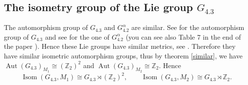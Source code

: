 \documentclass[12pt,a4paper,twoside]{article}
\theoremstyle{definition}
\begin{document}
\subsection{The isometry group of the Lie group $G_{4.3}$}
The automorphism group of $G_{4.3}$ and $G_{4.2}^{\alpha}$ are similar. See \cite{christodoulakis2003automorphisms} for the automorphism group of $G_{4.3}$ and see \cite{christodoulakis2003corrigendum} for the one of $G_{4.2}^{\alpha}$ (you can see also Table 7 in the end of the paper \cite{biggs2016classification}). Hence these Lie groups have similar metrics, see \cite{aitbenhaddou2025classification}. Therefore they have similar isometric automorphism groups, thus by theorem \ref{similar}, we have $\operatorname{Aut}\left(G_{4.3}\right)_{M_1}  \cong \left(\mathbb{Z}_2\right)^2$ and $\operatorname{Aut}\left(G_{4.3}\right)_{M_2}  \cong \mathbb{Z}_2$. Hence
$$\operatorname{Isom}\left(G_{4.3}, M_{1}\right)  \cong G_{4.3} \rtimes \left(\mathbb{Z}_2\right)^2, \qquad \operatorname{Isom}\left(G_{4.3}, M_{2}\right)  \cong G_{4.3} \rtimes \mathbb{Z}_2.$$
\end{document}
